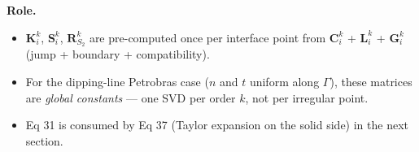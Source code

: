 \medskip

\textbf{Role.}
\begin{itemize}
  \item $\boldsymbol{K}_i^k$, $\boldsymbol{S}_i^k$, $\boldsymbol{R}_{S_2}^k$
    are pre-computed once per interface point from $\boldsymbol{C}_i^k$ +
    $\boldsymbol{L}_i^k$ + $\boldsymbol{G}_i^k$ (jump + boundary + compatibility).
  \item For the dipping-line Petrobras case ($n$ and $t$ uniform along
    $\Gamma$), these matrices are \emph{global constants} — one SVD per
    order $k$, not per irregular point.
  \item Eq 31 is consumed by Eq 37 (Taylor expansion on the solid side)
    in the next section.
\end{itemize}
